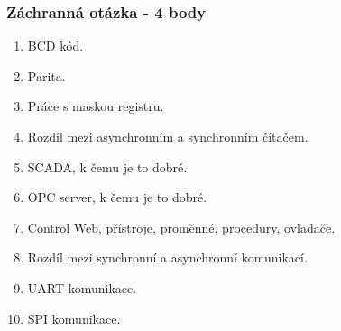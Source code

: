 	\begin{frame}
    \frametitle{Záchranná otázka - 4 body}
		\small
		\begin{enumerate}
			\item BCD kód.
			\item Parita.
			\item Práce s maskou registru.
			\item Rozdíl mezi asynchronním a synchronním čítačem.
			\item SCADA, k čemu je to dobré.
			\item OPC server, k čemu je to dobré.
			\item Control Web, přístroje, proměnné, procedury, ovladače.
			\item Rozdíl mezi synchronní a asynchronní komunikací.
			\item UART komunikace.
			\item SPI komunikace.
		\end{enumerate}
		
	\end{frame}